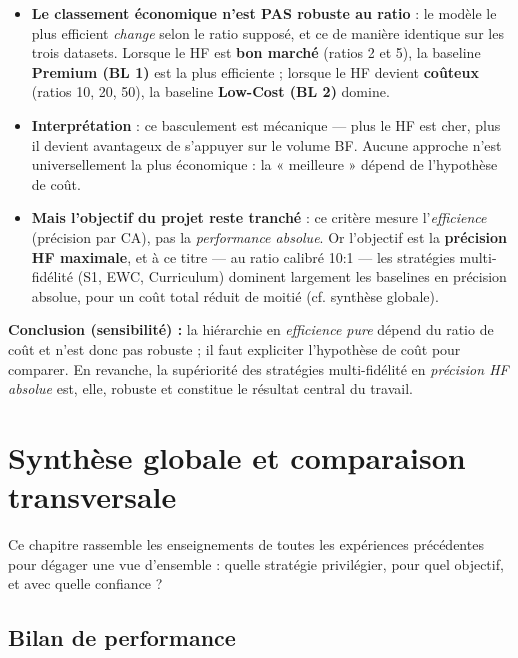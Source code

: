 \documentclass[11pt,a4paper,openany]{book}
\begin{document}
\begin{itemize}
  \item \textbf{Le classement économique n'est PAS robuste au ratio} : le modèle le plus efficient \emph{change} selon le ratio supposé, et ce de manière identique sur les trois datasets. Lorsque le HF est \textbf{bon marché} (ratios 2 et 5), la baseline \textbf{Premium (BL 1)} est la plus efficiente ; lorsque le HF devient \textbf{coûteux} (ratios 10, 20, 50), la baseline \textbf{Low-Cost (BL 2)} domine.
  \item \textbf{Interprétation} : ce basculement est mécanique — plus le HF est cher, plus il devient avantageux de s'appuyer sur le volume BF. Aucune approche n'est universellement la plus économique : la « meilleure » dépend de l'hypothèse de coût.
  \item \textbf{Mais l'objectif du projet reste tranché} : ce critère mesure l'\emph{efficience} (précision par CA), pas la \emph{performance absolue}. Or l'objectif est la \textbf{précision HF maximale}, et à ce titre — au ratio calibré 10:1 — les stratégies multi-fidélité (S1, EWC, Curriculum) dominent largement les baselines en précision absolue, pour un coût total réduit de moitié (cf. synthèse globale).
\end{itemize}

\begin{decisionbox}
  \textbf{Conclusion (sensibilité) :} la hiérarchie en \emph{efficience pure} dépend du ratio de coût et n'est donc pas robuste ; il faut expliciter l'hypothèse de coût pour comparer. En revanche, la supériorité des stratégies multi-fidélité en \emph{précision HF absolue} est, elle, robuste et constitue le résultat central du travail.
\end{decisionbox}


\chapter{Synthèse globale et comparaison transversale}

Ce chapitre rassemble les enseignements de toutes les expériences précédentes pour dégager une vue d'ensemble : quelle stratégie privilégier, pour quel objectif, et avec quelle confiance ?

\section{Bilan de performance}
\end{document}
